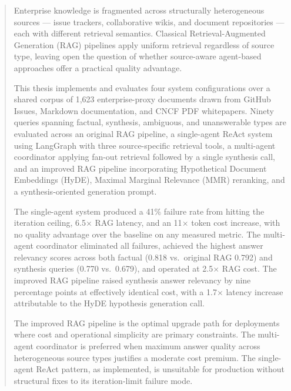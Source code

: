
\renewcommand{\abstractname}{Abstract}
\begin{abstract}
Enterprise knowledge is fragmented across structurally heterogeneous sources --- issue trackers, collaborative wikis, and document repositories --- each with different retrieval semantics. Classical Retrieval-Augmented Generation (RAG) pipelines apply uniform retrieval regardless of source type, leaving open the question of whether source-aware agent-based approaches offer a practical quality advantage.

This thesis implements and evaluates four system configurations over a shared corpus of 1,623 enterprise-proxy documents drawn from GitHub Issues, Markdown documentation, and CNCF PDF whitepapers. Ninety queries spanning factual, synthesis, ambiguous, and unanswerable types are evaluated across an original RAG pipeline, a single-agent ReAct system using LangGraph with three source-specific retrieval tools, a multi-agent coordinator applying fan-out retrieval followed by a single synthesis call, and an improved RAG pipeline incorporating Hypothetical Document Embeddings (HyDE), Maximal Marginal Relevance (MMR) reranking, and a synthesis-oriented generation prompt.

The single-agent system produced a 41\% failure rate from hitting the iteration ceiling, 6.5$\times$ RAG latency, and an 11$\times$ token cost increase, with no quality advantage over the baseline on any measured metric. The multi-agent coordinator eliminated all failures, achieved the highest answer relevancy scores across both factual (0.818 vs.\ original RAG 0.792) and synthesis queries (0.770 vs.\ 0.679), and operated at 2.5$\times$ RAG cost. The improved RAG pipeline raised synthesis answer relevancy by nine percentage points at effectively identical cost, with a 1.7$\times$ latency increase attributable to the HyDE hypothesis generation call.

The improved RAG pipeline is the optimal upgrade path for deployments where cost and operational simplicity are primary constraints. The multi-agent coordinator is preferred when maximum answer quality across heterogeneous source types justifies a moderate cost premium. The single-agent ReAct pattern, as implemented, is unsuitable for production without structural fixes to its iteration-limit failure mode.
\end{abstract}
